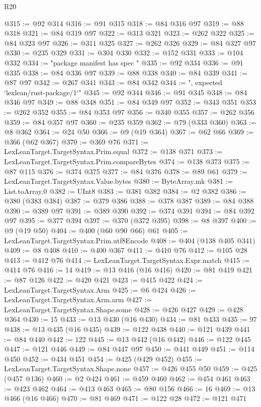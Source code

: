 \begin{lexlean}{R20}
\begin{coremodule}
@315 := @92 @314
@316 := @91 @315
@318 := @84 @316 @97
@319 := @88 @318
@321 := @84 @319 @97
@322 := @313 @321
@323 := @262 @322
@325 := @84 @323 @97
@326 := @311 @325
@327 := @262 @326
@329 := @84 @327 @97
@330 := @235 @329
@331 := @304 @330
@332 := @152 @331
@333 := @104 @332
@334 := "package manifest has spec "
@335 := @92 @334
@336 := @91 @335
@338 := @84 @336 @97
@339 := @88 @338
@340 := @84 @339
@341 := @87 @97
@342 := @267 @341
@343 := @84 @342
@344 := ", expected `lexlean/rust-package/1`"
@345 := @92 @344
@346 := @91 @345
@348 := @84 @346 @97
@349 := @88 @348
@351 := @84 @349 @97
@352 := @343 @351
@353 := @262 @352
@355 := @84 @353 @97
@356 := @340 @355
@357 := @262 @356
@359 := @84 @357 @97
@360 := @235 @359
@362 := @79 (@333 @360)
@363 := @8 @362
@364 := @24 @50
@366 := @9 (@19 @364)
@367 := @62 @66
@369 := @366 (@62 @367)
@370 := @369 @76
@371 := LexLeanTarget.TargetSyntax.Prim.equal
@372 := @138 @371
@373 := LexLeanTarget.TargetSyntax.Prim.compareBytes
@374 := @138 @373
@375 := @87 @115
@376 := @374 @375
@377 := @84 @376
@378 := @89 @61
@379 := LexLeanTarget.TargetSyntax.Value.bytes
@380 := ByteArray.mk
@381 := List.toArray.{0}
@382 := UInt8
@383 := @381 @382
@384 := @2 @382
@386 := @380 (@383 @384)
@387 := @379 @386
@388 := @378 @387
@389 := @84 @388
@390 := @389 @97
@391 := @389 @390
@392 := @374 @391
@394 := @84 @392 @97
@395 := @377 @394
@397 := @370 (@372 @395)
@398 := @8 @397
@400 := @9 (@19 @50)
@404 := @400 (@60 @90 @66) @61
@405 := LexLeanTarget.TargetSyntax.Prim.utf8Encode
@408 := @404 (@138 @405 @341)
@409 := @8 @408
@410 := @400 @367
@411 := @410 @76
@412 := @105 @28
@413 := @412 @76
@414 := LexLeanTarget.TargetSyntax.Expr.match
@415 := @414 @76
@416 := 14
@419 := @13 @416 (@16 @416)
@420 := @81 @419
@421 := @87 @126
@422 := @420 @421
@423 := @415 @422
@424 := LexLeanTarget.TargetSyntax.Arm
@425 := @6 @424
@426 := LexLeanTarget.TargetSyntax.Arm.arm
@427 := LexLeanTarget.TargetSyntax.Shape.some
@428 := @426 @427
@429 := @428 @364
@430 := 15
@433 := @13 @430 (@16 @430)
@434 := @81 @433
@435 := 97
@438 := @13 @435 (@16 @435)
@439 := @122 @438
@440 := @121 @439
@441 := @84 @440
@442 := 122
@445 := @13 @442 (@16 @442)
@446 := @122 @445
@447 := @121 @446
@449 := @84 @447 @97
@450 := @441 @449
@451 := @114 @450
@452 := @434 @451
@454 := @425 (@429 @452)
@455 := LexLeanTarget.TargetSyntax.Shape.none
@457 := @426 @455 @50
@459 := @425 (@457 @136)
@460 := @2 @424
@461 := @459 @460
@462 := @454 @461
@463 := @423 @462
@464 := @413 @463
@465 := @80 @156
@466 := 16
@469 := @13 @466 (@16 @466)
@470 := @81 @469
@471 := @122 @28
@472 := @121 @471

\end{coremodule}
\end{lexlean}

